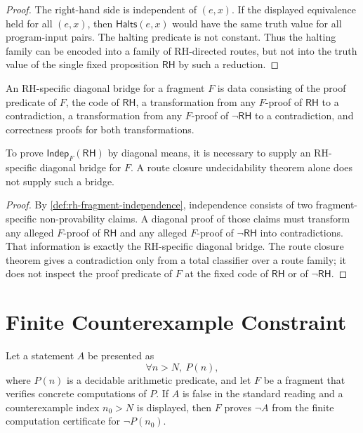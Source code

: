 \begin{proof}
The right-hand side is independent of $(e,x)$. If the displayed equivalence
held for all $(e,x)$, then $\mathsf{Halts}(e,x)$ would have the same truth
value for all program-input pairs. The halting predicate is not constant.
Thus the halting family can be encoded into a family of RH-directed routes,
but not into the truth value of the single fixed proposition
$\mathsf{RH}$ by such a reduction.
\end{proof}

\begin{definition}
\label{def:rh-specific-diagonal-bridge}
An RH-specific diagonal bridge for a fragment $F$ is data consisting of the
proof predicate of $F$, the code of $\mathsf{RH}$, a transformation from
any $F$-proof of $\mathsf{RH}$ to a contradiction, a transformation from
any $F$-proof of $\neg\mathsf{RH}$ to a contradiction, and correctness
proofs for both transformations.
\end{definition}

\begin{theorem}
\label{thm:rh-independence-requires-specific-bridge}
To prove $\mathsf{Indep}_{F}(\mathsf{RH})$ by diagonal means, it is
necessary to supply an RH-specific diagonal bridge for $F$. A route closure
undecidability theorem alone does not supply such a bridge.
\end{theorem}

\begin{proof}
By \autoref{def:rh-fragment-independence}, independence consists of two
fragment-specific non-provability claims. A diagonal proof of those claims
must transform any alleged $F$-proof of $\mathsf{RH}$ and any alleged
$F$-proof of $\neg\mathsf{RH}$ into contradictions. That information is
exactly the RH-specific diagonal bridge. The route closure theorem gives a
contradiction only from a total classifier over a route family; it does not
inspect the proof predicate of $F$ at the fixed code of $\mathsf{RH}$ or
of $\neg\mathsf{RH}$.
\end{proof}

\section{Finite Counterexample Constraint}
\label{sec:rh-finite-counterexample-constraint}

\begin{theorem}
\label{thm:rh-finite-counterexample-constraint}
Let a statement $A$ be presented as
$$
\forall n>N,\ P(n),
$$
where $P(n)$ is a decidable arithmetic predicate, and let $F$ be a fragment
that verifies concrete computations of $P$. If $A$ is false in the standard
reading and a counterexample index $n_0>N$ is displayed, then $F$ proves
$\neg A$ from the finite computation certificate for $\neg P(n_0)$.
\end{theorem}


